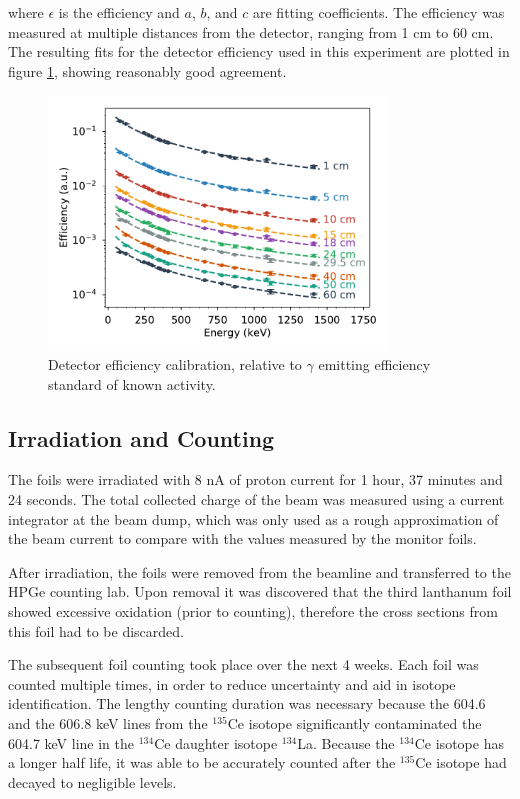 \documentclass[aps,superscriptaddress,twocolumn,secnumarabic,balancelastpage,amsmath,amssymb,nofootinbib,floatfix]{revtex4-1}
\begin{document}
where $\epsilon$ is the efficiency and $a$, $b$, and $c$ are fitting coefficients.  The efficiency was measured at multiple distances from the detector, ranging from 1 cm to 60 cm.  The resulting fits for the detector efficiency used in this experiment are plotted in figure \ref{fig:efficiency_calibration}, showing reasonably good agreement.

\begin{figure}[htb]
\includegraphics[width=9cm]{calibration/efficiency_calibration.pdf}
\caption{Detector efficiency calibration, relative to $\gamma$ emitting efficiency standard of known activity.
}
\label{fig:efficiency_calibration}
\end{figure}

\subsection{Irradiation and Counting}
The foils were irradiated with 8 nA of proton current for 1 hour, 37 minutes and 24 seconds.  The total collected charge of the beam was measured using a current integrator at the beam dump, which was only used as a rough approximation of the beam current to compare with the values measured by the monitor foils.

After irradiation, the foils were removed from the beamline and transferred to the HPGe counting lab.  Upon removal it was discovered that the third lanthanum foil showed excessive oxidation (prior to counting), therefore the cross sections from this foil had to be discarded.

The subsequent foil counting took place over the next 4 weeks.  Each foil was counted multiple times, in order to reduce uncertainty and aid in isotope identification.  The lengthy counting duration was necessary because the 604.6 and the 606.8 keV lines from the $^{135}$Ce isotope significantly contaminated the 604.7 keV line in the $^{134}$Ce daughter isotope $^{134}$La. Because the $^{134}$Ce isotope has a longer half life, it was able to be accurately counted after the $^{135}$Ce isotope had decayed to negligible levels.
\end{document}
